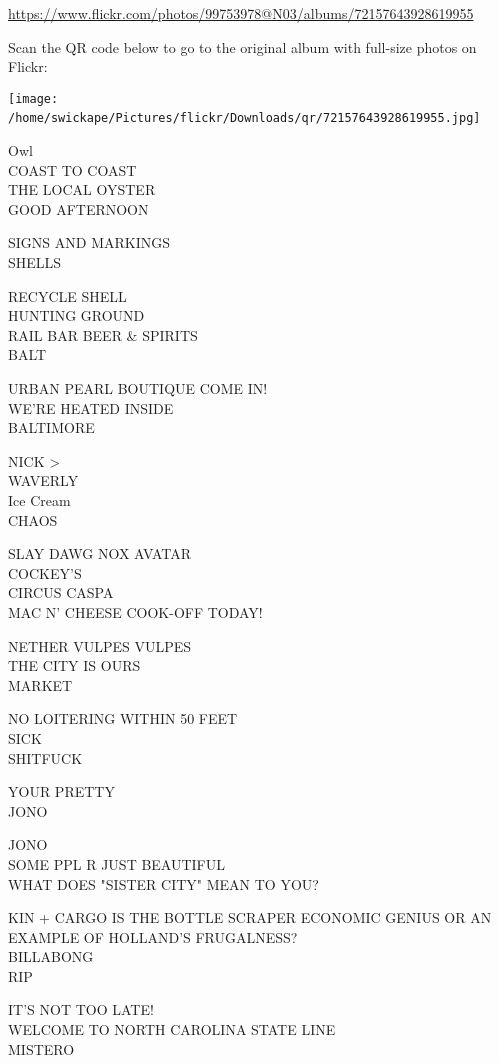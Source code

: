 \documentclass[10pt,letterpaper]{article}
\begin{document}
\url{https://www.flickr.com/photos/99753978@N03/albums/72157643928619955}

Scan the QR code below to go to the original album with full-size photos on Flickr:

\texttt{[image: /home/swickape/Pictures/flickr/Downloads/qr/72157643928619955.jpg]}
\

Owl\\
COAST TO COAST\\
THE LOCAL OYSTER\\
GOOD AFTERNOON

SIGNS AND MARKINGS\\
SHELLS

RECYCLE SHELL\\
HUNTING GROUND\\
RAIL BAR BEER \& SPIRITS\\
BALT

URBAN PEARL BOUTIQUE COME IN!\\
WE'RE HEATED INSIDE\\
BALTIMORE

NICK >\\
WAVERLY\\
Ice Cream\\
CHAOS

SLAY DAWG NOX AVATAR\\
COCKEY'S\\
CIRCUS CASPA\\
MAC N' CHEESE COOK{-}OFF TODAY!

NETHER VULPES VULPES\\
THE CITY IS OURS\\
MARKET

NO LOITERING WITHIN 50 FEET\\
SICK\\
SHITFUCK

YOUR PRETTY\\
JONO

JONO\\
SOME PPL R JUST BEAUTIFUL\\
WHAT DOES "SISTER CITY" MEAN TO YOU?

KIN + CARGO IS THE BOTTLE SCRAPER ECONOMIC GENIUS OR AN EXAMPLE OF HOLLAND'S FRUGALNESS?\\
BILLABONG\\
RIP

IT'S NOT TOO LATE!\\
WELCOME TO NORTH CAROLINA STATE LINE\\
MISTERO
\end{document}
